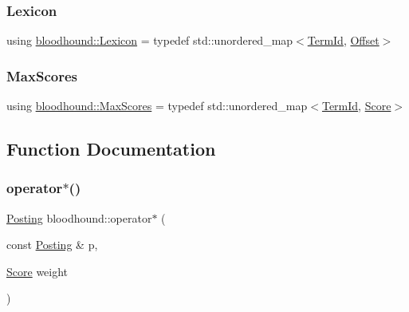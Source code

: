 \mbox{\label{namespacebloodhound_a94032a3533df0a1b6d3435bad57e6499}} 
\subsubsection{\texorpdfstring{Lexicon}{Lexicon}}
{\footnotesize\ttfamily using \hyperlink{namespacebloodhound_a94032a3533df0a1b6d3435bad57e6499}{bloodhound\+::\+Lexicon} = typedef std\+::unordered\+\_\+map$<$\hyperlink{structbloodhound_1_1TermId}{Term\+Id}, \hyperlink{structbloodhound_1_1Offset}{Offset}$>$}

\mbox{\label{namespacebloodhound_a687d80c6f992eba8b820bf30a482f4b4}} 
\subsubsection{\texorpdfstring{Max\+Scores}{MaxScores}}
{\footnotesize\ttfamily using \hyperlink{namespacebloodhound_a687d80c6f992eba8b820bf30a482f4b4}{bloodhound\+::\+Max\+Scores} = typedef std\+::unordered\+\_\+map$<$\hyperlink{structbloodhound_1_1TermId}{Term\+Id}, \hyperlink{structbloodhound_1_1Score}{Score}$>$}



\subsection{Function Documentation}
\mbox{\label{namespacebloodhound_a0ee8a7512bc2dea6326445fa8b7509b2}} 
\subsubsection{\texorpdfstring{operator$\ast$()}{operator*()}}
{\footnotesize\ttfamily \hyperlink{structbloodhound_1_1Posting}{Posting} bloodhound\+::operator$\ast$ (\begin{DoxyParamCaption}\item[{const \hyperlink{structbloodhound_1_1Posting}{Posting} \&}]{p,  }\item[{\hyperlink{structbloodhound_1_1Score}{Score}}]{weight }\end{DoxyParamCaption})}


